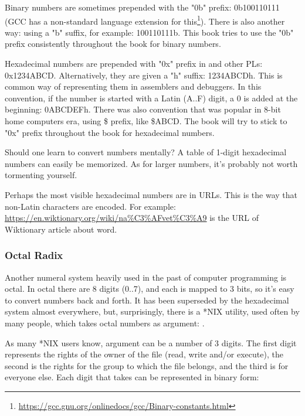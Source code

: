Binary numbers are sometimes prepended with the "0b" prefix: 0b100110111 (\ac{GCC} has a non-standard language extension for this\footnote{\url{https://gcc.gnu.org/onlinedocs/gcc/Binary-constants.html}}).
There is also another way: using a "b" suffix, for example: 100110111b.
This book tries to use the "0b" prefix consistently throughout the book for binary numbers. %

Hexadecimal numbers are prepended with "0x" prefix in \CCpp and other \ac{PL}s: 0x1234ABCD.
Alternatively, they are given a "h" suffix: 1234ABCDh. This is common way of representing them in assemblers and debuggers.
In this convention, if the number is started with a Latin (A..F) digit, a 0 is added at the beginning: 0ABCDEFh.
There was also convention that was popular in 8-bit home computers era, using \$ prefix, like \$ABCD.
The book will try to stick to "0x" prefix throughout the book for hexadecimal numbers. %

Should one learn to convert numbers mentally? A table of 1-digit hexadecimal numbers can easily be memorized.
As for larger numbers, it's probably not worth tormenting yourself.

Perhaps the most visible hexadecimal numbers are in \ac{URL}s.
This is the way that non-Latin characters are encoded.
For example:
\url{https://en.wiktionary.org/wiki/na\%C3\%AFvet\%C3\%A9} is the \ac{URL} of Wiktionary article about  word.

\subsubsection{Octal Radix}

Another numeral system heavily used in the past of computer programming is octal. In octal there are 8 digits (0..7), and each is mapped to 3 bits, so it's easy to convert numbers back and forth.
It has been superseded by the hexadecimal system almost everywhere, but, surprisingly, there is a *NIX utility, used often by many people, which takes octal numbers as argument: .

As many *NIX users know,  argument can be a number of 3 digits. The first digit represents the rights of the owner of the file (read, write and/or execute), the second is the rights for the group to which the file belongs, and the third is for everyone else.
Each digit that  takes can be represented in binary form:

